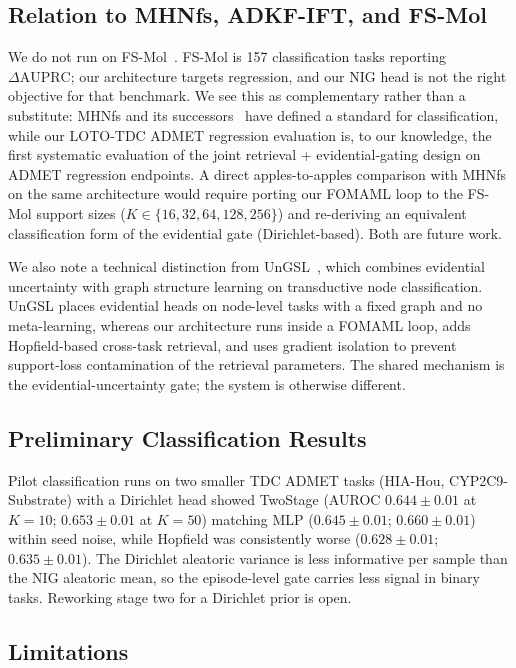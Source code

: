 \documentclass{article}
\theoremstyle{plain}
\theoremstyle{definition}
\theoremstyle{remark}
\begin{document}
\subsection{Relation to MHNfs, ADKF-IFT, and FS-Mol}

We do not run on FS-Mol~\citep{stanley2021fsmol}. FS-Mol is 157 classification tasks reporting $\Delta\text{AUPRC}$; our architecture targets regression, and our NIG head is not the right objective for that benchmark. We see this as complementary rather than a substitute: MHNfs and its successors~\citep{chen2023adkfift,wang2024pintuning,unimatch2025} have defined a standard for classification, while our LOTO-TDC ADMET regression evaluation is, to our knowledge, the first systematic evaluation of the joint retrieval + evidential-gating design on ADMET regression endpoints. A direct apples-to-apples comparison with MHNfs on the same architecture would require porting our FOMAML loop to the FS-Mol support sizes ($K\!\in\!\{16,32,64,128,256\}$) and re-deriving an equivalent classification form of the evidential gate (Dirichlet-based). Both are future work.

We also note a technical distinction from UnGSL~\citep{han2025ungsl}, which combines evidential uncertainty with graph structure learning on transductive node classification. UnGSL places evidential heads on node-level tasks with a fixed graph and no meta-learning, whereas our architecture runs inside a FOMAML loop, adds Hopfield-based cross-task retrieval, and uses gradient isolation to prevent support-loss contamination of the retrieval parameters. The shared mechanism is the evidential-uncertainty gate; the system is otherwise different.

\subsection{Preliminary Classification Results}

Pilot classification runs on two smaller TDC ADMET tasks (HIA-Hou, CYP2C9-Substrate) with a Dirichlet head showed TwoStage (AUROC $0.644{\pm}0.01$ at $K{=}10$; $0.653{\pm}0.01$ at $K{=}50$) matching MLP ($0.645{\pm}0.01$; $0.660{\pm}0.01$) within seed noise, while Hopfield was consistently worse ($0.628{\pm}0.01$; $0.635{\pm}0.01$). The Dirichlet aleatoric variance is less informative per sample than the NIG aleatoric mean, so the episode-level gate carries less signal in binary tasks. Reworking stage two for a Dirichlet prior is open.

\subsection{Limitations}
\end{document}
